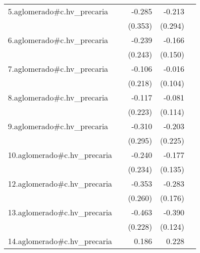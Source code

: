 {\begin{longtable}{l*{4}{D{.}{.}{-1}}}
\addlinespace
5.aglomerado#c.hv\_precaria&                     &      -0.285         &      -0.213         &                     \\
            &                     &     (0.353)         &     (0.294)         &                     \\
\addlinespace
6.aglomerado#c.hv\_precaria&                     &      -0.239         &      -0.166         &                     \\
            &                     &     (0.243)         &     (0.150)         &                     \\
\addlinespace
7.aglomerado#c.hv\_precaria&                     &      -0.106         &      -0.016         &                     \\
            &                     &     (0.218)         &     (0.104)         &                     \\
\addlinespace
8.aglomerado#c.hv\_precaria&                     &      -0.117         &      -0.081         &                     \\
            &                     &     (0.223)         &     (0.114)         &                     \\
\addlinespace
9.aglomerado#c.hv\_precaria&                     &      -0.310         &      -0.203         &                     \\
            &                     &     (0.295)         &     (0.225)         &                     \\
\addlinespace
10.aglomerado#c.hv\_precaria&                     &      -0.240         &      -0.177         &                     \\
            &                     &     (0.234)         &     (0.135)         &                     \\
\addlinespace
12.aglomerado#c.hv\_precaria&                     &      -0.353         &      -0.283         &                     \\
            &                     &     (0.260)         &     (0.176)         &                     \\
\addlinespace
13.aglomerado#c.hv\_precaria&                     &      -0.463\sym{*}  &      -0.390\sym{**} &                     \\
            &                     &     (0.228)         &     (0.124)         &                     \\
\addlinespace
14.aglomerado#c.hv\_precaria&                     &       0.186         &       0.228         &                     \\

\end{longtable}}
